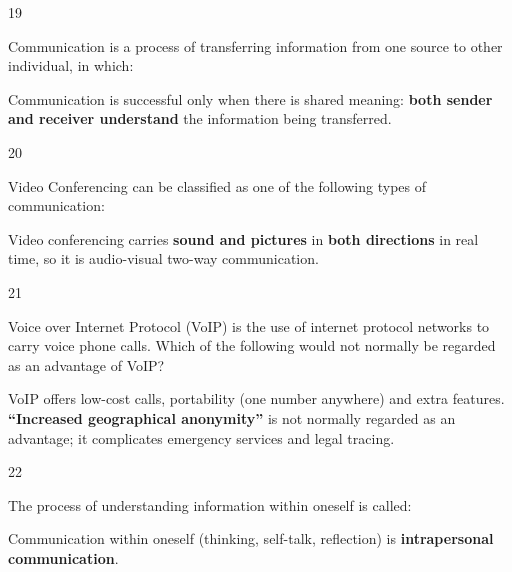 \begin{question}{19}
{Communication is a process of transferring information from one source to other individual, in which:\par}
\begin{explain}
Communication is successful only when there is shared meaning: \textbf{both sender and receiver understand} the information being transferred.
\end{explain}
\end{question}

\begin{question}{20}
{Video Conferencing can be classified as one of the following types of communication:\par}
\begin{explain}
Video conferencing carries \textbf{sound and pictures} in \textbf{both directions} in real time, so it is audio-visual two-way communication.
\end{explain}
\end{question}

\begin{question}{21}
{Voice over Internet Protocol (VoIP) is the use of internet protocol networks to carry voice phone calls. Which of the following would not normally be regarded as an advantage of VoIP?\par}
\begin{explain}
VoIP offers low-cost calls, portability (one number anywhere) and extra features. \textbf{``Increased geographical anonymity''} is not normally regarded as an advantage; it complicates emergency services and legal tracing.
\end{explain}
\end{question}

\begin{question}{22}
{The process of understanding information within oneself is called:\par}
\begin{explain}
Communication within oneself (thinking, self-talk, reflection) is \textbf{intrapersonal communication}.
\end{explain}
\end{question}

